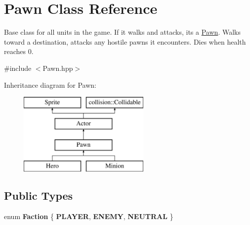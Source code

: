 \hypertarget{class_pawn}{}\section{Pawn Class Reference}
\label{class_pawn}


Base class for all units in the game. If it walks and attacks, it\textquotesingle{}s a \hyperlink{class_pawn}{Pawn}. Walks toward a destination, attacks any hostile pawns it encounters. Dies when health reaches 0.  




{\ttfamily \#include $<$Pawn.\+hpp$>$}

Inheritance diagram for Pawn\+:\begin{figure}[H]
\begin{center}
\leavevmode
\includegraphics[height=4.000000cm]{class_pawn}
\end{center}
\end{figure}
\subsection*{Public Types}
\begin{DoxyCompactItemize}
\item 
\hypertarget{class_pawn_a74f1dff8fc508734c15223aaf95f7566}{}enum {\bfseries Faction} \{ {\bfseries P\+L\+A\+Y\+E\+R}, 
{\bfseries E\+N\+E\+M\+Y}, 
{\bfseries N\+E\+U\+T\+R\+A\+L}
 \}\label{class_pawn_a74f1dff8fc508734c15223aaf95f7566}

\end{DoxyCompactItemize}
